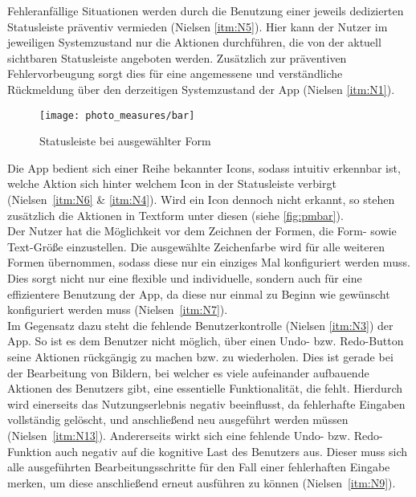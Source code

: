 Fehleranfällige Situationen werden durch die Benutzung einer jeweils dedizierten Statusleiste präventiv vermieden (Nielsen \autoref{itm:N5}).
Hier kann der Nutzer im jeweiligen Systemzustand nur die Aktionen durchführen, die von der aktuell sichtbaren Statusleiste angeboten werden.
Zusätzlich zur präventiven Fehlervorbeugung sorgt dies für eine angemessene und verständliche Rückmeldung über den derzeitigen Systemzustand der App (Nielsen \autoref{itm:N1}). \\

\begin{wrapfigure}{R}{0.4\textwidth}
  \centering
  \texttt{[image: photo\_measures/bar]}
  \caption{Statusleiste bei ausgewählter Form}
  \label{fig:pmbar}
\end{wrapfigure}

\noindent
Die App bedient sich einer Reihe bekannter Icons, sodass intuitiv erkennbar ist, welche Aktion sich hinter welchem Icon in der Statusleiste verbirgt (Nielsen~\autoref{itm:N6} \& \autoref{itm:N4}).
Wird ein Icon dennoch nicht erkannt, so stehen zusätzlich die Aktionen in Textform unter diesen (siehe \autoref{fig:pmbar}). \\

Der Nutzer hat die Möglichkeit vor dem Zeichnen der Formen, die Form- sowie Text-Größe einzustellen.
Die ausgewählte Zeichenfarbe wird für alle weiteren Formen übernommen, sodass diese nur ein einziges Mal konfiguriert werden muss.
Dies sorgt nicht nur eine flexible und individuelle, sondern auch für eine effizientere Benutzung der App, da diese nur einmal zu Beginn wie gewünscht konfiguriert werden muss (Nielsen~\autoref{itm:N7}). \\

Im Gegensatz dazu steht die fehlende Benutzerkontrolle (Nielsen \autoref{itm:N3}) der App.
So ist es dem Benutzer nicht möglich, über einen Undo- bzw. Redo-Button seine Aktionen rückgängig zu machen bzw. zu wiederholen.
Dies ist gerade bei der Bearbeitung von Bildern, bei welcher es viele aufeinander aufbauende Aktionen des Benutzers gibt, eine essentielle Funktionalität, die fehlt.
Hierdurch wird einerseits das Nutzungserlebnis negativ beeinflusst, da fehlerhafte Eingaben vollständig gelöscht, und anschließend neu ausgeführt werden müssen (Nielsen~\autoref{itm:N13}).
Andererseits wirkt sich eine fehlende Undo- bzw. Redo-Funktion auch negativ auf die kognitive Last des Benutzers aus.
Dieser muss sich alle ausgeführten Bearbeitungsschritte für den Fall einer fehlerhaften Eingabe merken, um diese anschließend erneut ausführen zu können (Nielsen~\autoref{itm:N9}). \\


